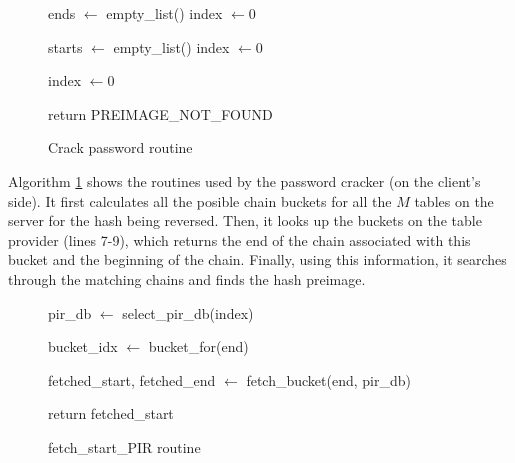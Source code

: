 \documentclass{llncs}
\begin{document}
\begin{figure} [ht]
\vspace{-0.5 cm}
\begin{algorithm}[H]
  \caption{Crack password routine}
  \label{algo:password_cracker_routines}\DontPrintSemicolon



  ends $\gets$ empty\_list() \;
  index $\gets 0$ \;

  starts $\gets$ empty\_list() \;
  index $\gets 0 $ \;

  index $\gets 0 $ \;

	
  return PREIMAGE\_NOT\_FOUND
\end{algorithm}
\vspace{-0.5 cm}
\end{figure}

Algorithm \ref{algo:password_cracker_routines} shows the routines used by 
the password cracker (on the client's side). It first calculates all the posible
chain buckets for all the $M$ tables on the server for the hash being reversed.
Then, it looks up the buckets on the table provider (lines 7-9), which returns the end of
the chain associated with this bucket and the beginning of the chain. Finally,
using this information, it searches through the matching chains and finds the hash
preimage.


\begin{figure} [ht]
\vspace{-0.5 cm}
\begin{algorithm}[H]
  \caption{fetch\_start\_PIR routine}
  \label{algo:fetch_start}\DontPrintSemicolon



  pir\_db $\gets$ select\_pir\_db(index) \;

  bucket\_idx $\gets$ bucket\_for(end) \;

  fetched\_start, fetched\_end $\gets$ fetch\_bucket(end, pir\_db) \;

  return fetched\_start \;
\end{algorithm}

\vspace{-0.5 cm}
\end{figure}
\end{document}
